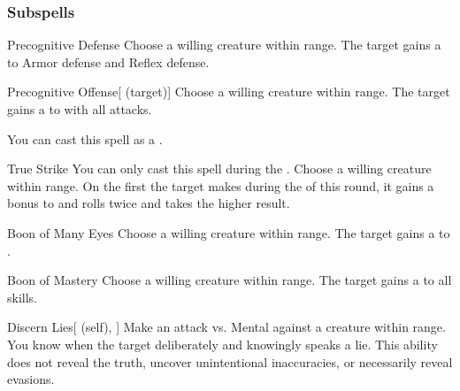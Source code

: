 \subsubsection{Subspells}


\begin{ability}[\nth{1}]{Precognitive Defense}
Choose a willing creature within \rngclose range.
The target gains a   to Armor defense and Reflex defense.
\end{ability}
\vspace{0.25em}


\begin{ability}[\nth{1}]{Precognitive Offense}[ (target)]
Choose a willing creature within \rngclose range.
The target gains a   to  with all attacks.

You can cast this spell as a .
\end{ability}
\vspace{0.25em}


\begin{ability}[\nth{1}]{True Strike}
You can only cast this spell during the .
Choose a willing creature within \rngclose range.
On the first  the target makes during the  of this round, it gains a  bonus to  and rolls twice and takes the higher result.
\end{ability}
\vspace{0.25em}


\begin{ability}[\nth{2}]{Boon of Many Eyes}
Choose a willing creature within \rngclose range.
The target gains a   to .
\end{ability}
\vspace{0.25em}


\begin{ability}[\nth{2}]{Boon of Mastery}
Choose a willing creature within \rngclose range.
The target gains a   to all skills.
\end{ability}
\vspace{0.25em}


\begin{ability}[\nth{2}]{Discern Lies}[ (self), ]
Make an attack vs. Mental against a creature within \rngmed range.
\hit You know when the target deliberately and knowingly speaks a lie.
This ability does not reveal the truth, uncover unintentional inaccuracies, or necessarily reveal evasions.
\end{ability}
\vspace{0.25em}


